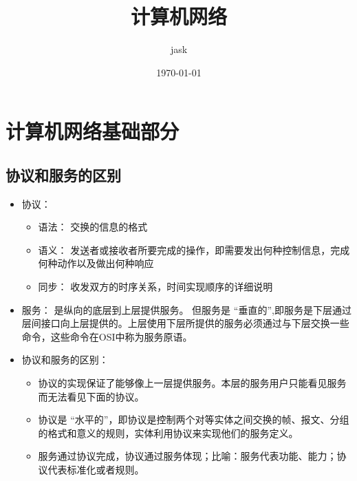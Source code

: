 \documentclass[11pt]{article}
\author{jask}
\date{\today}
\title{计算机网络}
\begin{document}
\maketitle
\setcounter{tocdepth}{3}
\tableofcontents

\section{计算机网络基础部分}
\label{sec:org73063d1}
\subsection{协议和服务的区别}
\label{sec:orgd7964cd}
\begin{itemize}
\item 协议：
\begin{itemize}
\item 语法： 交换的信息的格式
\item 语义： 发送者或接收者所要完成的操作，即需要发出何种控制信息，完成何种动作以及做出何种响应
\item 同步： 收发双方的时序关系，时间实现顺序的详细说明
\end{itemize}
\item 服务： 是纵向的底层到上层提供服务。
但服务是 “垂直的”,即服务是下层通过层间接口向上层提供的。上层使用下层所提供的服务必须通过与下层交换一些命令，这些命令在OSI中称为服务原语。
\item 协议和服务的区别：
\begin{itemize}
\item 协议的实现保证了能够像上一层提供服务。本层的服务用户只能看见服务而无法看见下面的协议。
\item 协议是 “水平的”，即协议是控制两个对等实体之间交换的帧、报文、分组的格式和意义的规则，实体利用协议来实现他们的服务定义。
\item 服务通过协议完成，协议通过服务体现；比喻：服务代表功能、能力；协议代表标准化或者规则。
\end{itemize}
\end{itemize}
\end{document}
